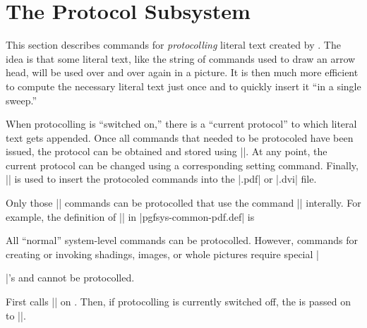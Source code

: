 %

\section{The Protocol Subsystem}

\label{section-protocols}

\makeatletter

This section describes commands for \emph{protocolling} literal text
created by \pgfname. The idea is that some literal text, like the string
of commands used to draw an arrow head, will be used over and over
again in a picture. It is then much more efficient to compute the
necessary literal text just once and to quickly insert it ``in a
single sweep.''

When protocolling is ``switched on,'' there is a ``current protocol''
to which literal text gets appended. Once all commands that needed to
be protocoled have been issued, the protocol can be obtained and
stored using |\pgfsysprotocol@getcurrentprotocol|. At any point, the
current protocol can be changed using a corresponding setting
command. Finally, |\pgfsysprotocol@invokecurrentprotocol| is used to
insert the protocoled commands into the |.pdf| or |.dvi| file.

Only those |\pgfsys@| commands can be protocolled that use the
command |\pgfsysprotocol@literal| interally. For example, the
definition of |\pgfsys@moveto| in |pgfsys-common-pdf.def| is
\begin{codeexample}
\def\pgfsys@moveto#1#2{\pgfsysprotocol@literal{#1 #2 m}}
\end{codeexample}
All ``normal'' system-level commands can be protocolled. However,
commands for creating or invoking shadings, images, or whole pictures
require special |\special|'s and cannot be protocolled.


\begin{command}{\pgfsysprotocol@literal{}}
  First calls |\pgfsysprotocol@literalbuffered| on . Then, if protocolling is currently switched off, the
   is passed on to |\pgfsys@invoke|.
\end{command}

